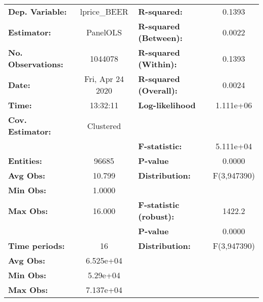 \documentclass{report}
\begin{document}
\begin{center}
\begin{tabular}{lclc}
\toprule
\textbf{Dep. Variable:}       &    lprice\_BEER    & \textbf{  R-squared:         }   &      0.1393      \\
\textbf{Estimator:}           &      PanelOLS      & \textbf{  R-squared (Between):}  &      0.0022      \\
\textbf{No. Observations:}    &      1044078       & \textbf{  R-squared (Within):}   &      0.1393      \\
\textbf{Date:}                &  Fri, Apr 24 2020  & \textbf{  R-squared (Overall):}  &      0.0024      \\
\textbf{Time:}                &      13:32:11      & \textbf{  Log-likelihood     }   &    1.111e+06     \\
\textbf{Cov. Estimator:}      &     Clustered      & \textbf{                     }   &                  \\
\textbf{}                     &                    & \textbf{  F-statistic:       }   &    5.111e+04     \\
\textbf{Entities:}            &       96685        & \textbf{  P-value            }   &      0.0000      \\
\textbf{Avg Obs:}             &       10.799       & \textbf{  Distribution:      }   &   F(3,947390)    \\
\textbf{Min Obs:}             &       1.0000       & \textbf{                     }   &                  \\
\textbf{Max Obs:}             &       16.000       & \textbf{  F-statistic (robust):} &      1422.2      \\
\textbf{}                     &                    & \textbf{  P-value            }   &      0.0000      \\
\textbf{Time periods:}        &         16         & \textbf{  Distribution:      }   &   F(3,947390)    \\
\textbf{Avg Obs:}             &     6.525e+04      & \textbf{                     }   &                  \\
\textbf{Min Obs:}             &      5.29e+04      & \textbf{                     }   &                  \\
\textbf{Max Obs:}             &     7.137e+04      & \textbf{                     }   &                  \\
\bottomrule
\end{tabular}
\begin{tabular}{lcccccc}

\end{tabular}
\end{center}
\end{document}
